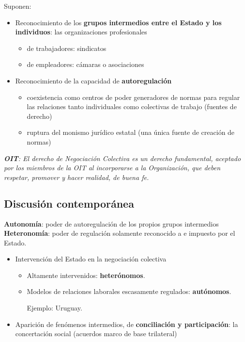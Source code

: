 \documentclass[spanish,12pt,a4paper,titlepage]{report}
\begin{document}
Suponen:
\begin{itemize}
	\item Reconocimiento de los \textbf{grupos intermedios entre el Estado y los individuos}: las organizaciones profesionales
	\begin{itemize}
		\item de trabajadores: sindicatos
		\item de empleadores: cámaras o asociaciones
	\end{itemize}
	\item Reconocimiento de la capacidad de \textbf{autoregulación}
	\begin{itemize}
		\item coexistencia como centros de poder generadores de normas para regular las relaciones tanto individuales como colectivas de trabajo (fuentes de derecho)
		\item ruptura del monismo jurídico estatal (una única fuente de creación de normas)
	\end{itemize}
\end{itemize}

\emph{\textbf{OIT}: El derecho de Negociación Colectiva es un derecho fundamental, aceptado por los miembros de la \emph{OIT} al incorporarse a la Organización, que deben respetar, promover y hacer realidad, de buena fe.}

\subsection{Discusión contemporánea}
\textbf{Autonomía}: poder de autoregulación de los propios grupos intermedios\\[4pt]
\indent \textbf{Heteronomía}: poder de regulación solamente reconocido a e impuesto por el Estado. 

\begin{itemize}
	\item Intervención del Estado en la negociación colectiva
	\begin{itemize}
		\item Altamente intervenidos: \textbf{heterónomos}.
		\item Modelos de relaciones laborales escasamente regulados: \textbf{autónomos}.

                  Ejemplo: Uruguay.
	\end{itemize}
	\item Aparición de fenómenos intermedios, de \textbf{conciliación y participación}: la concertación social (acuerdos marco de base trilateral)
\end{itemize}
\end{document}
